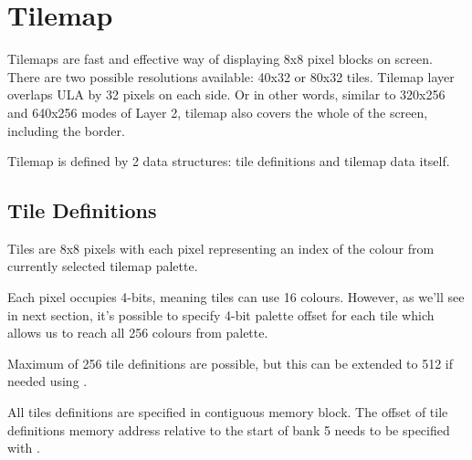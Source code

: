 \section{Tilemap}
\label{zx_next_tilemap}


Tilemaps are fast and effective way of displaying 8x8 pixel blocks on screen. There are two possible resolutions available: 40x32 or 80x32 tiles. Tilemap layer overlaps ULA by 32 pixels on each side. Or in other words, similar to 320x256 and 640x256 modes of Layer 2, tilemap also covers the whole of the screen, including the border.

Tilemap is defined by 2 data structures: tile definitions and tilemap data itself.


\subsection{Tile Definitions}

Tiles are 8x8 pixels with each pixel representing an index of the colour from currently selected tilemap palette.

Each pixel occupies 4-bits, meaning tiles can use 16 colours. However, as we'll see in next section, it's possible to specify 4-bit palette offset for each tile which allows us to reach all 256 colours from palette.

Maximum of 256 tile definitions are possible, but this can be extended to 512 if needed using .

All tiles definitions are specified in contiguous memory block. The offset of tile definitions memory address relative to the start of bank 5 needs to be specified with .


